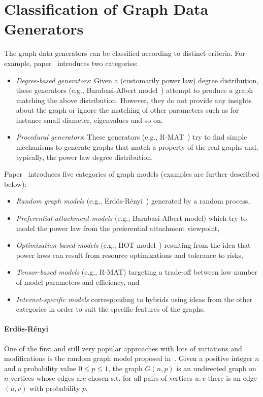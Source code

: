 \section{Classification of Graph Data Generators}
\label{sec:classification}

The graph data generators can be classified according to distinct criteria. For example, paper~\cite{DBLP:conf/sdm/ChakrabartiZF04} introduces two categories:

\begin{itemize}
  \item \emph{Degree-based generators}: Given a (customarily power law) degree distribution, these generators (e.g., Barabasi-Albert model~\cite{Barabasi99emergenceScaling}) attempt to produce a graph matching the above distribution. However, they do not provide any insights about the graph or ignore the matching of other parameters such as for instance small diameter, eigenvalues and so on.
  \item \emph{Procedural generators}: These generators (e.g., R-MAT~\cite{DBLP:conf/sdm/ChakrabartiZF04}) try to find simple mechanisms to generate graphs that match a property of the real graphs and, typically, the power law degree distribution.
\end{itemize}

Paper~\cite{Chakrabarti:2006:GML:1132952.1132954} introduces five categories of graph models (examples are further described below):
\begin{itemize}
  \item \emph{Random graph models} (e.g., Erd\"{o}s-R\'{e}nyi~\cite{Erdos:1960}) generated by a random process,
  \item \emph{Preferential attachment models} (e.g., Barabasi-Albert model) which try to model the power law from the preferential attachment viewpoint,
  \item \emph{Optimization-based models} (e.g., HOT model~\cite{PhysRevLett.84.2529}) resulting from the idea that power laws can result from resource optimizations and tolerance to risks,
  \item \emph{Tensor-based models} (e.g., R-MAT) targeting a trade-off between low number of model parameters and efficiency, and
  \item \emph{Internet-specific models} corresponding to hybrids using ideas from the other categories in order to suit the specific features of the graphs.
\end{itemize}

\paragraph{Erd\"{o}s-R\'{e}nyi} One of the first and still very popular approaches with lots of variations and modifications is the random graph model proposed in~\cite{Erdos:1960}. Given a positive integer $n$ and a probability value $0 \leq p \leq 1$, the graph $G(n,p)$ is an undirected graph on $n$ vertices whose edges are chosen s.t. for all pairs of vertices $u,v$ there is an edge $(u,v)$ with probability $p$.

